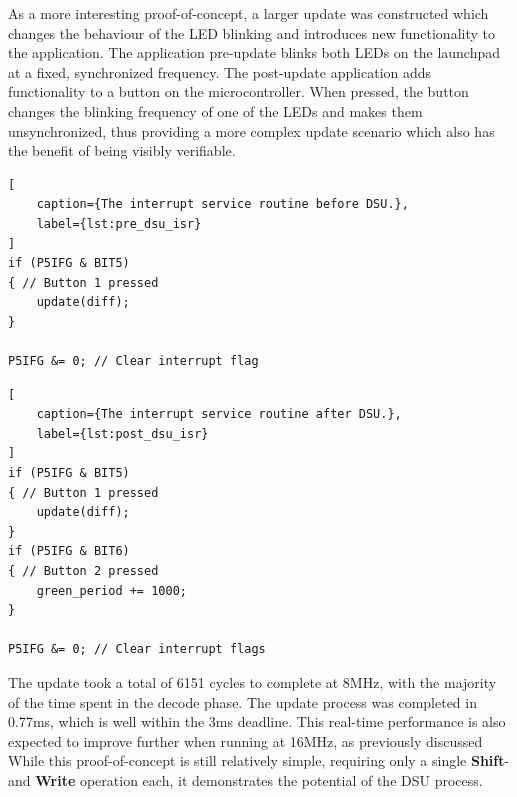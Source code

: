 As a more interesting proof-of-concept, a larger update was constructed which changes the behaviour of the LED blinking and introduces new functionality to the application. The application pre-update blinks both LEDs on the launchpad at a fixed, synchronized frequency. The post-update application adds functionality to a button on the microcontroller. When pressed, the button changes the blinking frequency of one of the LEDs and makes them unsynchronized, thus providing a more complex update scenario which also has the benefit of being visibly verifiable. 
\begin{framed}
\noindent\begin{minipage}{.45\textwidth}
\begin{lstlisting}[
    caption={The interrupt service routine before DSU.},
    label={lst:pre_dsu_isr}
]
if (P5IFG & BIT5)
{ // Button 1 pressed
    update(diff);
}

P5IFG &= 0; // Clear interrupt flag
\end{lstlisting}
\end{minipage}\hfill
\noindent\begin{minipage}{.45\textwidth}
\begin{lstlisting}[
    caption={The interrupt service routine after DSU.},
    label={lst:post_dsu_isr}
]
if (P5IFG & BIT5)
{ // Button 1 pressed
    update(diff);
} 
if (P5IFG & BIT6)
{ // Button 2 pressed
    green_period += 1000;
}

P5IFG &= 0; // Clear interrupt flags
\end{lstlisting}
\end{minipage}
\end{framed}\hfill

The update took a total of 6151 cycles to complete at 8MHz, with the majority of the time spent in the decode phase. The update process was completed in 0.77ms, which is well within the 3ms deadline. This real-time performance is also expected to improve further when running at 16MHz, as previously discussed While this proof-of-concept is still relatively simple, requiring only a single \textbf{Shift}- and \textbf{Write} operation each, it demonstrates the potential of the DSU process. 
